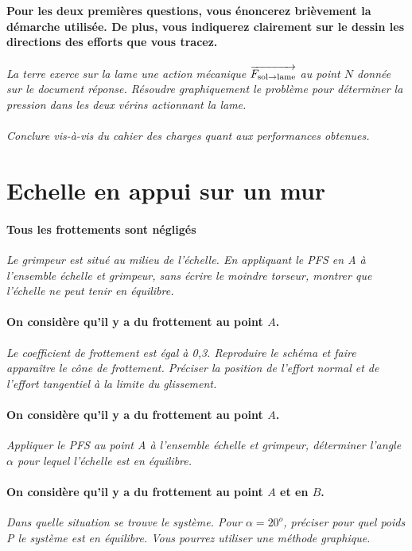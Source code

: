\documentclass[10pt,oneside]{article}
\begin{document}
\textbf{Pour les deux premières questions, vous énoncerez brièvement la démarche utilisée. De plus, vous indiquerez clairement sur le dessin les directions des efforts que vous tracez.}

\paragraph{}
\textit{La terre exerce sur la lame une action mécanique $\overrightarrow{F_{\text{sol}\rightarrow \text{lame}}}$ au point $N$ donnée sur le document réponse. Résoudre graphiquement le problème pour déterminer la pression dans les deux vérins actionnant la lame.}


\paragraph{}
\textit{Conclure vis-à-vis du cahier des charges quant aux performances obtenues.}



\section*{Echelle en appui sur un mur}

\setcounter{paragraph}{0}
\paragraph{Tous les frottements sont négligés}
\textit{Le grimpeur est situé au milieu de l'échelle. En appliquant le PFS en A à l'ensemble échelle et grimpeur, sans écrire le moindre torseur, montrer que l'échelle ne peut tenir en équilibre.}

\paragraph{On considère qu'il y a du frottement au point $A$.}
\textit{Le coefficient de frottement est égal à 0,3. Reproduire le schéma et faire apparaître le cône de frottement. Préciser la position de l'effort normal et de l'effort tangentiel à la limite du glissement.}
 

\paragraph{On considère qu'il y a du frottement au point $A$.}
\textit{Appliquer le PFS au point A à l'ensemble échelle et grimpeur, déterminer l'angle $\alpha$ pour lequel l'échelle est en équilibre.}

\paragraph{On considère qu'il y a du frottement au point $A$ et en $B$.}
\textit{Dans quelle situation se trouve le système. Pour $\alpha=20^o$, préciser pour quel poids P le système est en équilibre. Vous pourrez utiliser une méthode graphique.}
\end{document}
